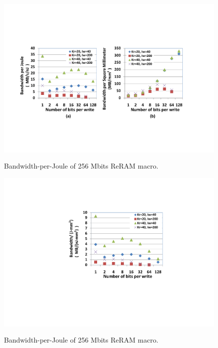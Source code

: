 



\begin{figure}[!]
\centering\label{fig:BWpAE}
  \includegraphics[width=3.4 in]{./figures/BWpAE}\\
  \caption{Bandwidth-per-Joule of 256 Mbits ReRAM macro.}
  \vspace{-5pt}
\end{figure}
\begin{figure}[!]
\centering\label{fig:BWpAE2}
  \includegraphics[width=2 in]{./figures/BWpAE2}\\
  \caption{Bandwidth-per-Joule of 256 Mbits ReRAM macro.}
  \vspace{-15pt}
\end{figure}
